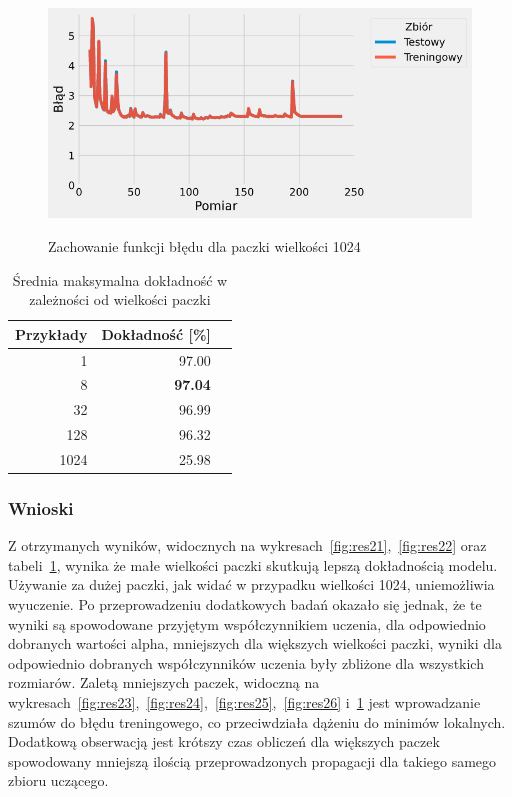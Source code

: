 \documentclass{article}
\begin{document}
\begin{figure}[H]
	\centering
	\caption{Zachowanie funkcji błędu dla paczki wielkości 1024}
	\includegraphics[width=\textwidth]{batch_err_1024.png}
	\label{fig:res27}
\end{figure}

\begin{table}[H]
	\caption{Średnia maksymalna dokładność w zależności od wielkości paczki}
	\label{tabela-res-21}
	\centering
	\begin{tabular}{rrr}
		\toprule
		Przykłady & Dokładność [\%] \\
		\midrule
		1          & 97.00              \\
		8          & \textbf{97.04}     \\
		32         & 96.99              \\
		128        & 96.32              \\
		1024       & 25.98              \\
		\bottomrule
	\end{tabular}
\end{table}

\subsubsection*{Wnioski}

Z otrzymanych wyników, widocznych na wykresach~\ref{fig:res21},~\ref{fig:res22} oraz tabeli~\ref{tabela-res-21}, wynika że małe wielkości paczki skutkują lepszą dokładnością modelu. Używanie za dużej paczki, jak widać w przypadku wielkości 1024, uniemożliwia wyuczenie. Po przeprowadzeniu dodatkowych badań okazało się jednak, że te wyniki są spowodowane przyjętym współczynnikiem uczenia, dla odpowiednio dobranych wartości alpha, mniejszych dla większych wielkości paczki, wyniki dla odpowiednio dobranych współczynników uczenia były zbliżone dla wszystkich rozmiarów. Zaletą mniejszych paczek, widoczną na wykresach~\ref{fig:res23},~\ref{fig:res24},~\ref{fig:res25},~\ref{fig:res26} i~\ref{fig:res27} jest wprowadzanie szumów do błędu treningowego, co przeciwdziała dążeniu do minimów lokalnych.
Dodatkową obserwacją jest krótszy czas obliczeń dla większych paczek spowodowany mniejszą ilością przeprowadzonych propagacji dla takiego samego zbioru uczącego.
\end{document}
